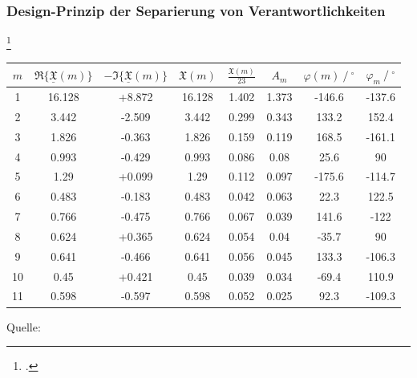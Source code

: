 \subsubsection{Design-Prinzip der Separierung von Verantwortlichkeiten}
\blindtext\footcite[Vgl. ][79]{Schelinski2019}

\begin{table}[h]
    \centering
    \begin{threeparttable}
        \centering
        \begin{tabular}{cccccccc}
            {$m$} & {$\Re\{\underline{\mathfrak{X}}(m)\}$} & {$-\Im\{\underline{\mathfrak{X}}(m)\}$} & {$\mathfrak{X}(m)$} & {$\frac{\mathfrak{X}(m)}{23}$} & {$A_m$} & {$\varphi(m)\ /\ ^{\circ}$} & {$\varphi_m\ /\ ^{\circ}$} \\
            \hline
            1  & 16.128 & +8.872 & 16.128 & 1.402 & 1.373 & -146.6 & -137.6 \\
            2  & 3.442  & -2.509 & 3.442  & 0.299 & 0.343 & 133.2  & 152.4  \\
            3  & 1.826  & -0.363 & 1.826  & 0.159 & 0.119 & 168.5  & -161.1 \\
            4  & 0.993  & -0.429 & 0.993  & 0.086 & 0.08  & 25.6   & 90     \\
            5  & 1.29   & +0.099 & 1.29   & 0.112 & 0.097 & -175.6 & -114.7 \\
            6  & 0.483  & -0.183 & 0.483  & 0.042 & 0.063 & 22.3   & 122.5  \\
            7  & 0.766  & -0.475 & 0.766  & 0.067 & 0.039 & 141.6  & -122   \\
            8  & 0.624  & +0.365 & 0.624  & 0.054 & 0.04  & -35.7  & 90     \\
            9  & 0.641  & -0.466 & 0.641  & 0.056 & 0.045 & 133.3  & -106.3 \\
            10 & 0.45   & +0.421 & 0.45   & 0.039 & 0.034 & -69.4  & 110.9  \\
            11 & 0.598  & -0.597 & 0.598  & 0.052 & 0.025 & 92.3   & -109.3 \\
            \hline
        \end{tabular}
        \begin{tablenotes}[flushleft]
        \item \normalsize{Quelle: \cite[][200]{bsp}}
        \end{tablenotes}
    \end{threeparttable}
\end{table}

